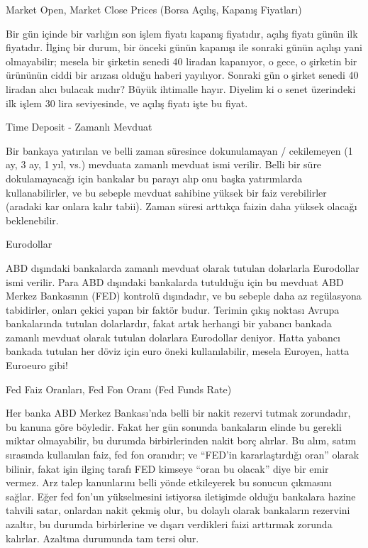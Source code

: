 \documentclass[12pt,fleqn]{article}\usepackage{../../common}
\begin{document}
Market Open, Market Close Prices (Borsa Açılış, Kapanış Fiyatları)

Bir gün içinde bir varlığın son işlem fiyatı kapanış fiyatıdır, açılış
fiyatı günün ilk fiyatıdır. İlginç bir durum, bir önceki günün kapanışı ile
sonraki günün açılışı yani olmayabilir; mesela bir şirketin senedi 40
liradan kapanıyor, o gece, o şirketin bir ürününün ciddi bir arızası olduğu
haberi yayılıyor. Sonraki gün o şirket senedi 40 liradan alıcı bulacak
mıdır? Büyük ihtimalle hayır. Diyelim ki o senet üzerindeki ilk işlem 30
lira seviyesinde, ve açılış fiyatı işte bu fiyat. 

Time Deposit - Zamanlı Mevduat

Bir bankaya yatırılan ve belli zaman süresince dokunulamayan / cekilemeyen (1
ay, 3 ay, 1 yıl, vs.) mevduata zamanlı mevduat ismi verilir. Belli bir süre
dokulamayacağı için bankalar bu parayı alıp onu başka yatırımlarda
kullanabilirler, ve bu sebeple mevduat sahibine yüksek bir faiz verebilirler
(aradaki kar onlara kalır tabii). Zaman süresi arttıkça faizin daha yüksek
olacağı beklenebilir.

Eurodollar

ABD dışındaki bankalarda zamanlı mevduat olarak tutulan dolarlarla Eurodollar
ismi verilir. Para ABD dışındaki bankalarda tutulduğu için bu mevduat ABD Merkez
Bankasının (FED) kontrolü dışındadır, ve bu sebeple daha az regülasyona
tabidirler, onları çekici yapan bir faktör budur. Terimin çıkış noktası
Avrupa bankalarında tutulan dolarlardır, fakat artık herhangi bir yabancı
bankada zamanlı mevduat olarak tutulan dolarlara Eurodollar deniyor. Hatta
yabancı bankada tutulan her döviz için euro öneki kullanılabilir, mesela
Euroyen, hatta Euroeuro gibi! 

Fed Faiz Oranları, Fed Fon Oranı (Fed Funds Rate)

Her banka ABD Merkez Bankası'nda belli bir nakit rezervi tutmak zorundadır, bu
kanuna göre böyledir. Fakat her gün sonunda bankaların elinde bu gerekli miktar
olmayabilir, bu durumda birbirlerinden nakit borç alırlar. Bu alım, satım
sırasında kullanılan faiz, fed fon oranıdır; ve ``FED'in kararlaştırdığı oran''
olarak bilinir, fakat işin ilginç tarafı FED kimseye ``oran bu olacak'' diye bir
emir vermez. Arz talep kanunlarını belli yönde etkileyerek bu sonucun çıkmasını
sağlar. Eğer fed fon'un yükselmesini istiyorsa iletişimde olduğu bankalara
hazine tahvili satar, onlardan nakit çekmiş olur, bu dolaylı olarak bankaların
rezervini azaltır, bu durumda birbirlerine ve dışarı verdikleri faizi arttırmak
zorunda kalırlar. Azaltma durumunda tam tersi olur.
\end{document}
